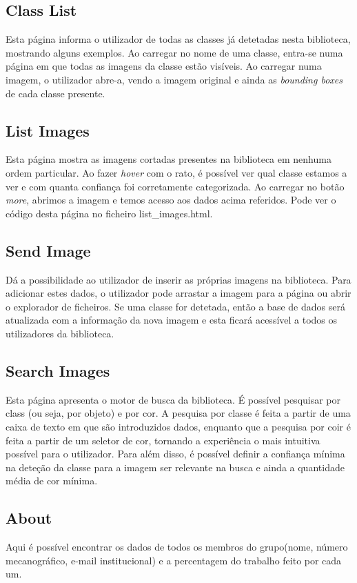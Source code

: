 \documentclass{report}
\begin{document}
\subsection{Class List}
Esta página informa o utilizador de todas as classes já detetadas nesta biblioteca, mostrando alguns exemplos. Ao carregar no nome de uma classe, entra-se numa página em que todas as imagens da classe estão visíveis. Ao carregar numa imagem, o utilizador abre-a, vendo a imagem original e ainda as \textit{bounding boxes} de cada classe presente.

\subsection{List Images}
Esta página mostra as imagens cortadas presentes na biblioteca em nenhuma ordem particular. Ao fazer \textit{hover} com o rato, é possível ver qual classe estamos a ver e com quanta confiança foi corretamente categorizada. Ao carregar no botão \textit{more}, abrimos a imagem e temos acesso aos dados acima referidos. Pode ver o código desta página no ficheiro list\_images.html.

\subsection{Send Image}
Dá a possibilidade ao utilizador de inserir as próprias imagens na biblioteca. Para adicionar estes dados, o utilizador pode arrastar a imagem para a página ou abrir o explorador de ficheiros. Se uma classe for detetada, então a base de dados será atualizada com a informação da nova imagem e esta ficará acessível a todos os utilizadores da biblioteca.

\subsection{Search Images}
Esta página apresenta o motor de busca da biblioteca. É possível pesquisar por class (ou seja, por objeto) e por cor. A pesquisa por classe é feita a partir de uma caixa de texto em que são introduzidos dados, enquanto que a pesquisa por coir é feita a partir de um seletor de cor, tornando a experiência o mais intuitiva possível para o utilizador. Para além disso, é possível definir a confiança mínima na deteção da classe para a imagem ser relevante na busca e ainda a quantidade média de cor mínima.

\subsection{About}
Aqui é possível encontrar os dados de todos os membros do grupo(nome, número mecanográfico, e-mail institucional) e a percentagem do trabalho feito por cada um.
\end{document}
